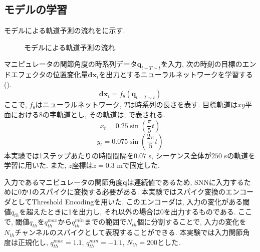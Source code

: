 \subsection{モデルの学習}
モデルによる軌道予測の流れをに示す.
\begin{figure}[htb]
    \centering
    
    \caption[モデルによる軌道予測の流れ]{
        モデルによる軌道予測の流れ.
    }
    \label{fig:model:learning:exp3}
\end{figure}
マニピュレータの関節角度の時系列データ$\bm{q}_{t-T \sim t}$を入力, 次の時刻の目標のエンドエフェクタの位置変化量$\bm{dx}_{t}$を出力とするニューラルネットワークを学習する ().
\begin{equation}
    \bm{dx}_{t} = f_{\theta}(\bm{q}_{t-T \sim t}) \label{eq:model:learning}
\end{equation}
ここで, $f_{\theta}$はニューラルネットワーク, $T$は時系列の長さを表す.
目標軌道は$xy$平面における8の字軌道とし, その軌道は, で表される.
\begin{equation}
    x_t=0.25 \sin (\frac{\pi}{5} t) \label{eq:model:target_trajectoryx}
\end{equation}
\begin{equation}
    y_t=0.075 \sin (\frac{2\pi}{5} t) \label{eq:model:target_trajectoryy}
\end{equation}
本実験では1ステップあたりの時間間隔を$0.07$ s, シーケンス全体が$250$ sの軌道を学習に用いた.
また, $z$座標は$z=0.3$ mで固定した.

入力であるマニピュレータの関節角度$\bm{q}$は連続値であるため, SNNに入力するために0か1のスパイクに変換する必要がある.
本実験ではスパイク変換のエンコーダとしてThreshold Encodingを用いた.
このエンコーダは, 入力の変化がある閾値$q_{th}$を超えたときに1を出力し, それ以外の場合は0を出力するものである.
ここで, 閾値$q_{th}$を$q_{th}^{max}$から$q_{th}^{min}$までの範囲で$N_{th}$個に分割することで, 入力の変化を$N_{th}$チャンネルのスパイクとして表現することができる.
本実験では入力関節角度は正規化し, $q_{th}^{max}=1.1$, $q_{th}^{min}=-1.1$, $N_{th}=200$とした.

